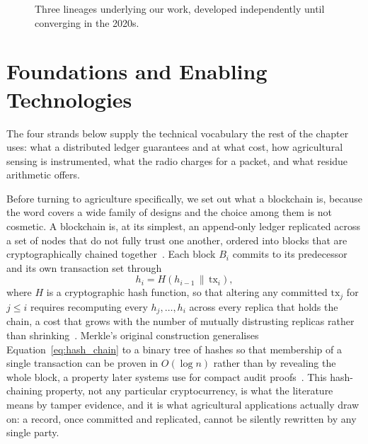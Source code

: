 \begin{figure}[htbp]
  \caption{Three lineages underlying our work, developed independently
           until converging in the 2020s.}
  \label{fig:lit-timeline}
\end{figure}

\section{Foundations and Enabling Technologies}
\label{sec:lit_foundations}

The four strands below supply the technical vocabulary the rest of the
chapter uses: what a distributed ledger guarantees and at what cost, how
agricultural sensing is instrumented, what the radio charges for a packet,
and what residue arithmetic offers.

\label{subsec:lit_fundamentals}

Before turning to agriculture specifically, we set out what a blockchain
is, because the word covers a wide family of designs and the choice among
them is not cosmetic. A blockchain is, at its simplest, an
append-only ledger replicated across a set of nodes that do not
fully trust one another, ordered into blocks that are cryptographically
chained together~\cite{christidis2016blockchain, debruyne2022trust}. Each
block $B_i$ commits to its predecessor and its own transaction set through
\begin{equation}
h_i = H\!\left( h_{i-1} \,\|\, \mathrm{tx}_i \right),
\label{eq:hash_chain}
\end{equation}
where $H$ is a cryptographic hash function, so that altering any committed
$\mathrm{tx}_j$ for $j \le i$ requires recomputing every $h_j,\ldots,h_i$
across every replica that holds the chain, a cost that grows with the
number of mutually distrusting replicas rather than
shrinking~\cite{fernandez2024iotTamper}. Merkle's original construction
generalises Equation~\ref{eq:hash_chain} to a binary tree of hashes so that
membership of a single transaction can be proven in $O(\log n)$ rather than
by revealing the whole block, a property later systems use for compact
audit proofs~\cite{sharma2018merkle}. This hash-chaining property, not any
particular cryptocurrency, is what the literature means by tamper evidence,
and it is what agricultural applications actually draw on: a record, once
committed and replicated, cannot be silently rewritten by any single party.

